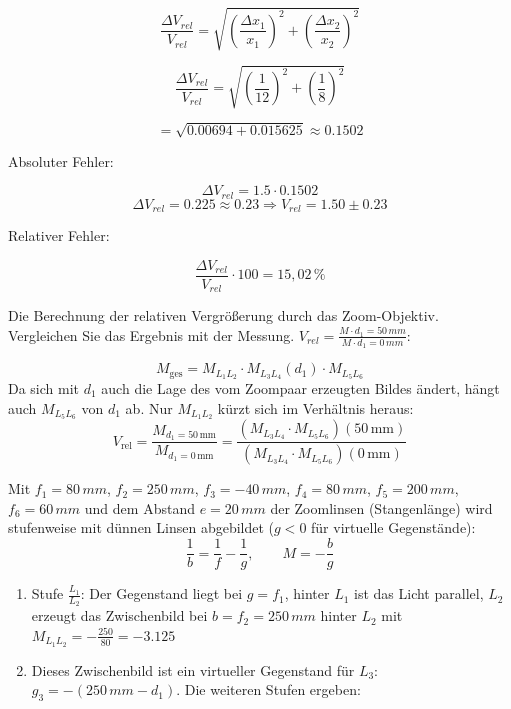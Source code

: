 \documentclass[
  headings=optiontotocandhead,
  twoside,
  openright,
  numbers=noenddot,
  toc=flat,
  11pt,
  parskip=full,
  listof=flat,
  bibliography=totoc,
  a4paper,
  DIV=14,
  BCOR=22mm,
  headheight=5mm,
  headinclude=true,
]{scrartcl}
\begin{document}
\[
\frac{\Delta V_{rel}}{V_{rel}}
=
\sqrt{
\left(\frac{\Delta x_1}{x_1}\right)^2
+
\left(\frac{\Delta x_2}{x_2}\right)^2
}
\]

\[
\frac{\Delta V_{rel}}{V_{rel}}
=
\sqrt{
\left(\frac{1}{12}\right)^2
+
\left(\frac{1}{8}\right)^2
}
\]

\[
= \sqrt{0.00694 + 0.015625}
\approx 0.1502
\]

Absoluter Fehler:

\[
\Delta V_{rel} = 1.5 \cdot 0.1502
\]
\[
\Delta V_{rel} = 0.225 \approx 0.23 \Rightarrow V_{rel} = 1.50 \pm 0.23
\]

Relativer Fehler:

\[
\frac{\Delta V_{rel}}{V_{rel}} \cdot 100
= 15{,}02\,\%
\]

Die Berechnung der relativen Vergrößerung durch das Zoom-Objektiv. Vergleichen Sie das Ergebnis mit der Messung. $V_{rel} = \frac{M \cdot d_1 = 50 \, mm}{M \cdot d_1 = 0 \, mm}$:

\begin{equation}
  M_\mathrm{ges} = M_{L_1 L_2} \cdot M_{L_3 L_4}(d_1) \cdot M_{L_5 L_6}
\end{equation}
Da sich mit $d_1$ auch die Lage des vom Zoompaar erzeugten Bildes ändert, hängt auch $M_{L_5 L_6}$ von $d_1$ ab. Nur $M_{L_1 L_2}$ kürzt sich im Verhältnis heraus:
\begin{equation}
  V_\mathrm{rel} = \frac{M_{d_1=50\,\mathrm{mm}}}{M_{d_1=0\,\mathrm{mm}}}
                 = \frac{(M_{L_3 L_4} \cdot M_{L_5 L_6})(50\,\mathrm{mm})}{(M_{L_3 L_4} \cdot M_{L_5 L_6})(0\,\mathrm{mm})}
\end{equation}
 
Mit $f_1 = 80\,mm$, $f_2 = 250\,mm$, $f_3 = -40\,mm$, $f_4 = 80\,mm$, $f_5 = 200\,mm$, $f_6 = 60\,mm$ und dem Abstand $e = 20\,mm$ der Zoomlinsen (Stangenlänge) wird stufenweise mit dünnen Linsen abgebildet ($g < 0$ für virtuelle Gegenstände):
$$ \frac{1}{b} = \frac{1}{f} - \frac{1}{g}, \qquad M = -\frac{b}{g} $$
 
\begin{enumerate}
  \item Stufe $\frac{L_1}{L_2}$: Der Gegenstand liegt bei $g = f_1$, hinter $L_1$ ist das Licht parallel, $L_2$ erzeugt das Zwischenbild bei $b = f_2 = 250\,mm$ hinter $L_2$ mit $M_{L_1 L_2} = -\frac{250}{80} = -3.125$
  \item Dieses Zwischenbild ist ein virtueller Gegenstand für $L_3$: $g_3 = -(250\,mm - d_1)$. Die weiteren Stufen ergeben:
\end{enumerate}
 
\end{document}
